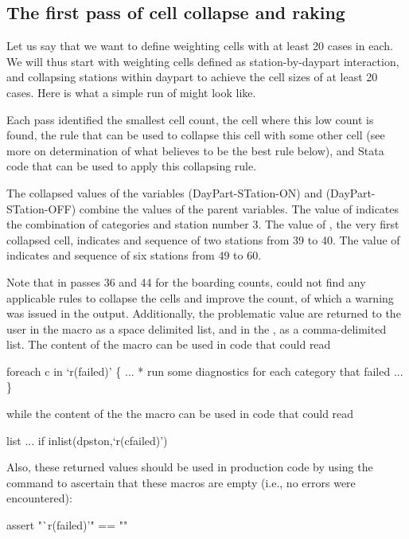 \subsection{The first pass of cell collapse and raking}

Let us say that we want to define weighting cells with at least 20 cases in each.
We will thus start with weighting cells defined as station-by-daypart interaction,
and collapsing stations within daypart to achieve the cell sizes of at least 20 cases.
Here is what a simple run of  might look like.

\cnp

\begin{stlog}
\nullskip
\end{stlog}

Each pass identified the smallest cell count, the cell where this low count is found,
the rule that can be used to collapse this cell with some other cell (see more on determination
of what  believes to be the best rule below), and Stata code
that can be used to apply this collapsing rule.

The collapsed values of the variables  (DayPart-STation-ON) and
 (DayPart-STation-OFF) combine the values of the parent variables. The value
of  indicates the combination of categories
 and station number 3.
\label{page:dpston:nomenclature}
The value of , the very first collapsed cell, indicates
 and sequence of two stations from 39 to 40.
The value of  indicates  and sequence of
six stations from 49 to 60.

Note that in passes 36 and 44 for the boarding counts, 
could not find any applicable rules to collapse the cells and improve the count,
of which a warning was issued in the output. Additionally, the problematic value are returned to the user
in the  macro as a space delimited list, and in the , as a comma-delimited list.
The content of the  macro can be used in code that could read

\begin{stlog}
foreach c in `r(failed)' \{
    ...
    * run some diagnostics for each category that failed
    ...
\}
\end{stlog}
while the content of the the  macro can be used in code that could
read
\begin{stlog}
list ... if inlist(dpston,`r(cfailed)')
\end{stlog}
Also, these returned values should be used in production code by using the  command
\citep{gould:2003:tip3} to ascertain that these macros are empty (i.e., no errors
were encountered):
\begin{stlog}
assert "`r(failed)'" == ""
\end{stlog}

